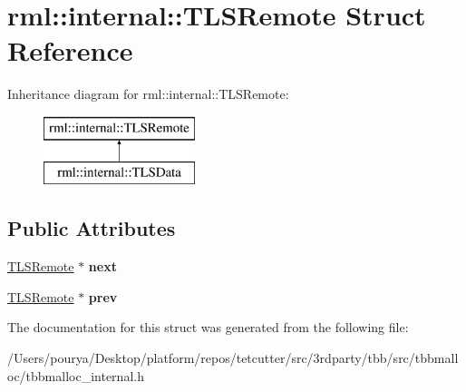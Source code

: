 \hypertarget{structrml_1_1internal_1_1TLSRemote}{}\section{rml\+:\+:internal\+:\+:T\+L\+S\+Remote Struct Reference}
\label{structrml_1_1internal_1_1TLSRemote}
Inheritance diagram for rml\+:\+:internal\+:\+:T\+L\+S\+Remote\+:\begin{figure}[H]
\begin{center}
\leavevmode
\includegraphics[height=2.000000cm]{structrml_1_1internal_1_1TLSRemote}
\end{center}
\end{figure}
\subsection*{Public Attributes}
\begin{DoxyCompactItemize}
\item 
\hypertarget{structrml_1_1internal_1_1TLSRemote_aa6e2f590f3cbad3968cbb62a5a23f6ee}{}\hyperlink{structrml_1_1internal_1_1TLSRemote}{T\+L\+S\+Remote} $\ast$ {\bfseries next}\label{structrml_1_1internal_1_1TLSRemote_aa6e2f590f3cbad3968cbb62a5a23f6ee}

\item 
\hypertarget{structrml_1_1internal_1_1TLSRemote_a455fa204dc7e55cc6859b0b92ff0105a}{}\hyperlink{structrml_1_1internal_1_1TLSRemote}{T\+L\+S\+Remote} $\ast$ {\bfseries prev}\label{structrml_1_1internal_1_1TLSRemote_a455fa204dc7e55cc6859b0b92ff0105a}

\end{DoxyCompactItemize}


The documentation for this struct was generated from the following file\+:\begin{DoxyCompactItemize}
\item 
/\+Users/pourya/\+Desktop/platform/repos/tetcutter/src/3rdparty/tbb/src/tbbmalloc/tbbmalloc\+\_\+internal.\+h\end{DoxyCompactItemize}
